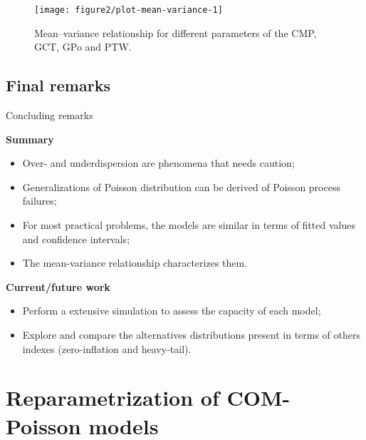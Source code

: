 \documentclass[11pt]{beamer}\usepackage[]{graphicx}\usepackage[]{color}
\begin{document}
\begin{frame}

\vspace{-0.3cm}
\begin{figure}[!htb]

{\centering \texttt{[image: figure2/plot-mean-variance-1]} 

}

\caption[Mean--variance relationship for different parameters of the CMP, GCT, GPo and PTW]{Mean--variance relationship for different parameters of the CMP, GCT, GPo and PTW.}\label{fig:plot-dispersion-index}
\end{figure}



\end{frame}

\subsection{Final remarks}

\begin{frame}{Concluding remarks}

  \textbf{Summary}
  \begin{itemize}
  \item Over- and underdispersion are phenomena that needs caution;
  \item Generalizations of Poisson distribution can be derived of
    Poisson process failures;
  \item For most practical problems, the models are similar in terms of
    fitted values and confidence intervals;
  \item The mean-variance relationship characterizes them.
  \end{itemize}
  \vspace{0.5cm}
  \textbf{Current/future work}
  \begin{itemize}
    \item Perform a extensive simulation to assess the capacity of each
      model;
    \item Explore and compare the alternatives distributions present in
      terms of others indexes (zero-inflation and heavy-tail).
  \end{itemize}
\end{frame}

\section{Reparametrization of COM-Poisson models}
\end{document}
